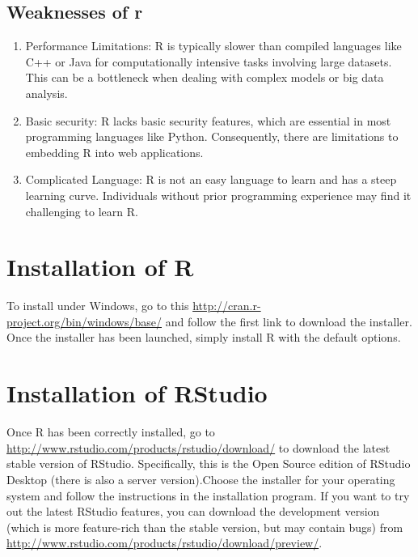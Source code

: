 \documentclass[
]{book}
\providecommand{\tightlist}{%
  \setlength{\itemsep}{0pt}\setlength{\parskip}{0pt}}
\begin{document}
\hypertarget{weaknesses-of-r}{%
\subsection*{Weaknesses of r}\label{weaknesses-of-r}}

\begin{enumerate}
\def\labelenumi{\arabic{enumi}.}
\tightlist
\item
  Performance Limitations: R is typically slower than compiled languages like C++ or Java for computationally intensive tasks involving large datasets. This can be a bottleneck when dealing with complex models or big data analysis.
\item
  Basic security: R lacks basic security features, which are essential in most programming languages like Python. Consequently, there are limitations to embedding R into web applications.
\item
  Complicated Language: R is not an easy language to learn and has a steep learning curve. Individuals without prior programming experience may find it challenging to learn R.
\end{enumerate}

\hypertarget{installation-of-r}{%
\section{Installation of R}\label{installation-of-r}}

To install under Windows, go to this \url{http://cran.r-project.org/bin/windows/base/} and follow the first link to download the installer. Once the installer has been launched, simply install R with the default options.

\hypertarget{installation-of-rstudio}{%
\section{Installation of RStudio}\label{installation-of-rstudio}}

Once R has been correctly installed, go to \url{http://www.rstudio.com/products/rstudio/download/} to download the latest stable version of RStudio. Specifically, this is the Open Source edition of RStudio Desktop (there is also a server version).Choose the installer for your operating system and follow the instructions in the installation program. If you want to try out the latest RStudio features, you can download the development version (which is more feature-rich than the stable version, but may contain bugs) from
\url{http://www.rstudio.com/products/rstudio/download/preview/}.
\end{document}
